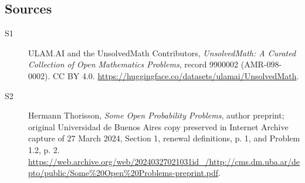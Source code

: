 \documentclass[11pt]{article}
\begin{document}
\subsection{Sources}
\begin{description}
\item[\hypertarget{source:9900002:1}{S1}] ULAM.AI and the UnsolvedMath Contributors, \emph{UnsolvedMath: A Curated Collection of Open Mathematics Problems}, record 9900002 (AMR-098-0002). CC BY 4.0. \url{https://huggingface.co/datasets/ulamai/UnsolvedMath}.
\item[\hypertarget{source:9900002:2}{S2}] Hermann Thorisson, \emph{Some Open Probability Problems}, author preprint; original Universidad de Buenos Aires copy preserved in Internet Archive capture of 27 March 2024, Section 1, renewal definitions, p. 1, and Problem 1.2, p. 2. \url{https://web.archive.org/web/20240327021031id_/http://cms.dm.uba.ar/depto/public/Some%20Open%20Problems-preprint.pdf}.
\end{description}
\label{end:9900002}
\end{document}

